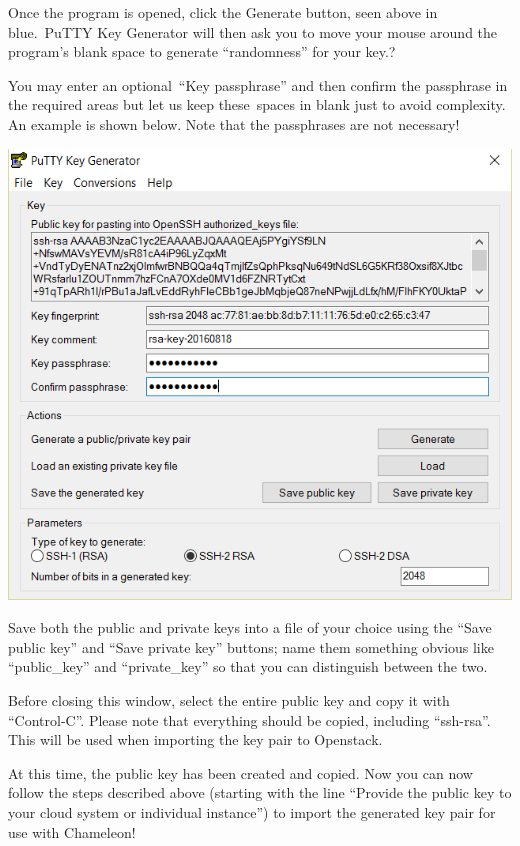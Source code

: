 Once the program is opened, click the Generate button, seen above in
blue.~PuTTY Key Generator will then ask you to move your mouse around
the program's blank space to generate ``randomness'' for your key.?

You may enter an optional~``Key passphrase'' and then confirm the
passphrase in the required areas but let us keep these~spaces in blank
just to avoid complexity. An example is shown below. Note that the
passphrases are not necessary!

\includegraphics[width=\columnwidth]{images/chameleon/putty3.png}

Save both the public and private keys into a file of your choice using
the ``Save public key'' and ``Save private key'' buttons; name them
something obvious like ``public\_key'' and ``private\_key'' so that you
can distinguish between the two.

Before closing this window, select the entire public key and copy it
with ``Control-C''. Please note that everything should be copied,
including ``ssh-rsa''. This will be used when importing the key pair to
Openstack.

At this time, the public key has been created and copied. Now you can
now follow the steps described above (starting with the line ``Provide
the public key to your cloud system or individual instance'') to import
the generated key pair for use with Chameleon!

